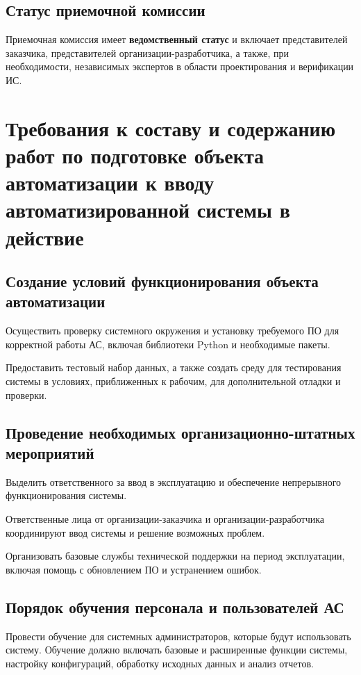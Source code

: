 \subsection{Статус приемочной комиссии}

Приемочная комиссия имеет \textbf{ведомственный статус}
и включает представителей заказчика,
представителей организации-разработчика, а также, при необходимости,
независимых экспертов в области проектирования и верификации ИС.

\section{Требования к составу и содержанию работ по подготовке
	объекта автоматизации к вводу автоматизированной системы в действие}

\subsection{Создание условий функционирования объекта автоматизации}

Осуществить проверку системного окружения
и установку требуемого ПО для корректной работы АС,
включая библиотеки Python и необходимые пакеты.

Предоставить тестовый набор данных,
а также создать среду для тестирования системы в условиях,
приближенных к рабочим, для дополнительной отладки и проверки.

\subsection{Проведение необходимых организационно-штатных мероприятий}

Выделить ответственного за ввод в эксплуатацию
и обеспечение непрерывного функционирования системы.

Ответственные лица от организации-заказчика
и организации-разработчика координируют ввод системы
и решение возможных проблем.

Организовать базовые службы технической поддержки на период эксплуатации,
включая помощь с обновлением ПО и устранением ошибок.

\subsection{Порядок обучения персонала и пользователей АС}

Провести обучение для системных администраторов,
которые будут использовать систему.
Обучение должно включать базовые и расширенные функции системы,
настройку конфигураций, обработку исходных данных и анализ отчетов.


